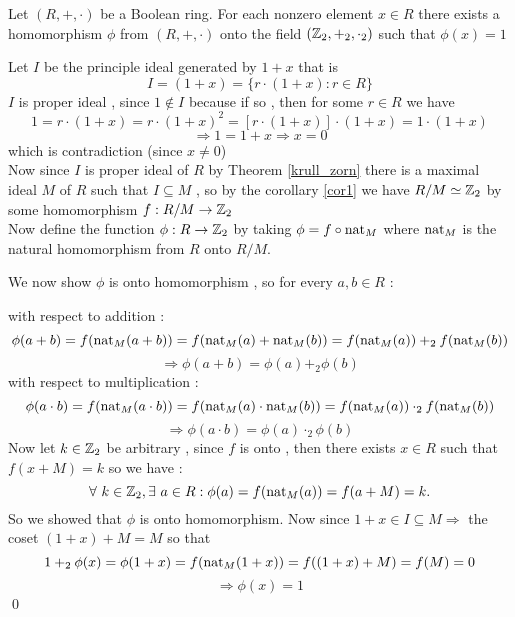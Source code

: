 \begin{lemma}
\label{lemma1}
    Let $(R,+,\cdot)$ be a Boolean ring. For each nonzero element $x\in R$ there exists a homomorphism $\phi$ from $(R,+,\cdot)$ onto the field $(\mathbb{Z}_2,+_2,\cdot_2)$ such that $\phi(x)=1$
\end{lemma}
\begin{myproof}
    Let $I$ be the principle ideal generated by $1+x$ that is $$I=(1+x)=\{r\cdot (1+x):r\in R\}$$
    $I$ is proper ideal , since $1\notin I$ because if so , then for some $r\in R$ we have
    $$1=r\cdot (1+x)=r\cdot (1+x)^2=[r\cdot (1+x)]\cdot(1+x)=1\cdot(1+x)$$$$\Longrightarrow 1=1+x\Longrightarrow x=0$$
   which is contradiction (since $x\neq 0$)\\
    Now since $I$ is proper ideal of $R$ by Theorem \ref{krull_zorn} there is a maximal ideal $M$ of $R$ such that $I\subseteq M$ , so by the corollary \ref{cor1} we have $R/M\simeq\mathbb{Z}_2$ by some homomorphism $f:R/M\to\mathbb{Z}_2$\\
    Now define the function $\phi:R\to\mathbb{Z}_2$ by taking $\phi=f\circ \operatorname{nat}_M$ where $\operatorname{nat}_M$ is the natural homomorphism from $R$ onto $R/M$.
\begin{figure}[ht]
\centering
{}
\end{figure}


We now show $\phi$ is onto homomorphism , so for every $a,b\in R$ : 

with respect to addition : $$\phi(a+b)=f(\operatorname{nat}_M(a+b))=f(\operatorname{nat}_M(a)+\operatorname{nat}_M(b))=f(\operatorname{nat}_M(a))+_2f(\operatorname{nat}_M(b))$$
$$\Longrightarrow \phi(a+b)=\phi(a)+_2\phi(b)$$
with respect to multiplication : 
$$\phi(a\cdot b)=f(\operatorname{nat}_M(a\cdot b))=f(\operatorname{nat}_M(a)\cdot \operatorname{nat}_M(b))=f(\operatorname{nat}_M(a))\cdot_2f(\operatorname{nat}_M(b))$$
$$\Longrightarrow \phi(a\cdot b)=\phi(a)\cdot_2\phi(b)$$
Now let $k\in\mathbb{Z}_2$ be arbitrary , since $f$ is onto , then there exists $x\in R$ such that $f(x+M)=k$ so we have : 
$$\forall\ k\in\Z_2,\exists\ a\in R: \phi(a)=f(\nat_M(a))=f(a+M)=k.$$
So we showed that $\phi$ is onto homomorphism.
Now since $1+x\in I\subseteq M\Longrightarrow$ the coset $(1+x)+M=M$ so that
$$1+_2\phi(x)=\phi(1+x)=f(\operatorname{nat}_M(1+x))=f((1+x)+M)=f(M)=0$$
$$\Longrightarrow \phi(x)=1$$\qed
\end{myproof}

